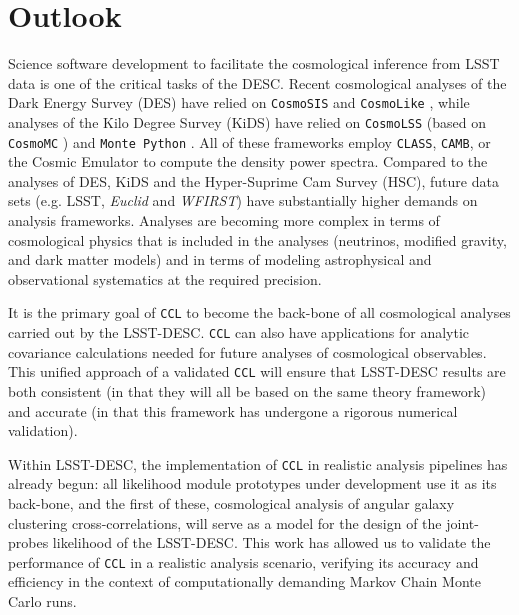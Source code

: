 \documentclass[\docopts]{\docclass}
\newcommand{\ccl}{{\tt CCL}\xspace}
\newcommand{\class}{{\tt CLASS}\xspace}
\newcommand{\camb}{{\tt CAMB}\xspace}
\begin{document}
\section{Outlook}
\label{sec:conclusion}

Science software development to facilitate the cosmological inference from LSST data is one of the critical tasks of the DESC. Recent cosmological analyses of the Dark Energy Survey (DES) have relied on {\tt CosmoSIS} \citep{Zuntz14} and {\tt CosmoLike} \citep{krause17}, while analyses of the Kilo Degree Survey (KiDS) have relied on {\tt CosmoLSS} \citep{Joudaki18} (based on {\tt CosmoMC} \citep{Lewis02}) and {\tt Monte Python} \citep{Audren12}. All of these frameworks employ \class, \camb \citep{Challinor2005}, or the Cosmic Emulator to compute the density power spectra. Compared to the analyses of DES, KiDS and the Hyper-Suprime Cam Survey (HSC), future data sets (e.g. LSST, {\it Euclid} and {\it WFIRST}) have substantially higher demands on analysis frameworks. Analyses are becoming more complex in terms of cosmological physics that is included in the analyses (neutrinos, modified gravity, and dark matter models) and in terms of modeling astrophysical and observational systematics at the required precision. 

It is the primary goal of \ccl to become the back-bone of all cosmological analyses carried out by the LSST-DESC. \ccl can also have applications for analytic covariance calculations needed for future analyses of cosmological observables. This unified approach of a validated \ccl will ensure that LSST-DESC results are both consistent (in that they will all be based on the same theory framework) and accurate (in that this framework has undergone a rigorous numerical validation).

Within LSST-DESC, the implementation of \ccl in realistic analysis pipelines has already begun: all likelihood module prototypes under development use it as its back-bone, and the first of these, cosmological analysis of angular galaxy clustering cross-correlations, will serve as a model for the design of the joint-probes likelihood of the LSST-DESC. This work has allowed us to validate the performance of \ccl in a realistic analysis scenario, verifying its accuracy and efficiency in the context of computationally demanding Markov Chain Monte Carlo runs. 
\end{document}
